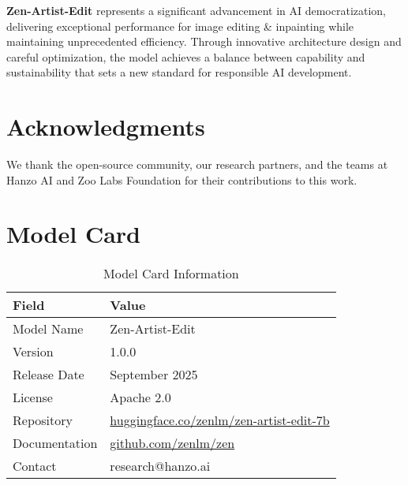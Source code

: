 \documentclass[11pt,a4paper]{article}
\begin{document}
\textbf{Zen-Artist-Edit} represents a significant advancement in AI democratization, 
delivering exceptional performance for image editing & inpainting while maintaining 
unprecedented efficiency. Through innovative architecture design and careful optimization, 
the model achieves a balance between capability and sustainability that sets a new standard 
for responsible AI development.

\section*{Acknowledgments}

We thank the open-source community, our research partners, and the teams at Hanzo AI and 
Zoo Labs Foundation for their contributions to this work.




\appendix

\section{Model Card}

\begin{table}[H]
\centering
\begin{tabular}{ll}
\toprule
\textbf{Field} & \textbf{Value} \\
\midrule
Model Name & Zen-Artist-Edit \\
Version & 1.0.0 \\
Release Date & September 2025 \\
License & Apache 2.0 \\
Repository & \href{https://huggingface.co/zenlm/zen-artist-edit-7b}{huggingface.co/zenlm/zen-artist-edit-7b} \\
Documentation & \href{https://github.com/zenlm/zen}{github.com/zenlm/zen} \\
Contact & research@hanzo.ai \\
\bottomrule
\end{tabular}
\caption{Model Card Information}
\end{table}
\end{document}
